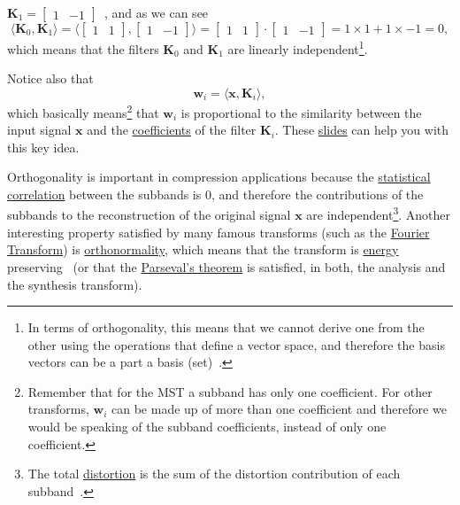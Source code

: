 ${\mathbf K}_1=\begin{bmatrix} 1 & -1\end{bmatrix}$~, and as we can
see
\begin{equation}
  \langle {\mathbf K}_0,{\mathbf K}_1 \rangle =
  \langle \begin{bmatrix}
    1 & 1
  \end{bmatrix}
  ,
  \begin{bmatrix}
    1 & -1
  \end{bmatrix}
  \rangle =
  \begin{bmatrix}
    1 & 1
  \end{bmatrix}
  \cdot
  \begin{bmatrix}
    1 & -1
  \end{bmatrix}
   = 1\times 1 + 1\times -1 = 0,
\end{equation}
which means that the filters ${\mathbf K}_0$ and ${\mathbf K}_1$ are linearly
independent\footnote{In terms of orthogonality, this means that we
  cannot derive one from the other using the operations that define a
  vector space, and therefore the basis vectors can be a part a basis
  (set)~\cite{strang4linear}.}.

Notice also that
\begin{equation}
  {\mathbf w}_i = \langle {\mathbf x}, {\mathbf K}_i\rangle,
\end{equation}
which basically means\footnote{Remember that for the MST a subband has
  only one coefficient. For other transforms, ${\mathbf w}_i$ can be
  made up of more than one coefficient and therefore we would be
  speaking of the subband coefficients, instead of only one
  coefficient.} that ${\mathbf w}_i$ is proportional to the similarity
between the input signal ${\mathbf x}$ and the
\href{https://en.wikipedia.org/wiki/Finite_impulse_response}{coefficients} of
the filter ${\mathbf K}_i$. These
\href{https://cseweb.ucsd.edu/classes/fa17/cse166-a/lec13.pdf}{slides}
can help you with this key idea.

Orthogonality is important in compression applications because the
\href{https://en.wikipedia.org/wiki/Correlation_and_dependence}{statistical
  correlation} between the subbands is 0, and therefore the
contributions of the subbands to the reconstruction of the original
signal ${\mathbf x}$ are independent\footnote{The total
  \href{https://en.wikipedia.org/wiki/Distortion}{distortion} is the
  sum of the distortion contribution of each
  subband~\cite{sayood2017introduction}.}. Another interesting
property satisfied by many famous transforms (such as the
\href{https://en.wikipedia.org/wiki/Fourier_transform}{Fourier
  Transform}) is
\href{https://en.wikipedia.org/wiki/Orthonormality}{orthonormality},
which means that the transform is
\href{https://en.wikipedia.org/wiki/Energy_(signal_processing)}{energy}
preserving~\cite{sayood2017introduction} (or that the
\href{https://en.wikipedia.org/wiki/Parseval%27s_theorem}{Parseval's
  theorem} is satisfied, in both, the analysis and the synthesis
transform).

